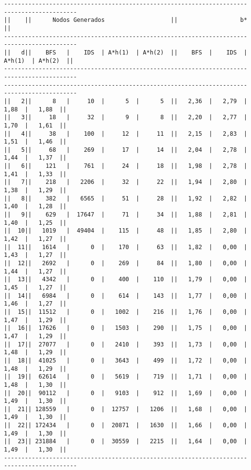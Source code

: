 \documentclass[a4paper]{article}
\begin{document}
\begin{lstlisting}[basicstyle=\footnotesize]
-------------------------------------------------------------------------------------------
||    ||      Nodos Generados                   ||                  b*                   ||
-------------------------------------------------------------------------------------------
||   d||    BFS   |    IDS  | A*h(1)  | A*h(2)  ||    BFS  |    IDS  | A*h(1)  | A*h(2)  ||
-------------------------------------------------------------------------------------------
-------------------------------------------------------------------------------------------
||   2||      8   |     10  |      5  |      5  ||   2,36  |   2,79  |   1,88  |   1,88  ||
||   3||     18   |     32  |      9  |      8  ||   2,20  |   2,77  |   1,70  |   1,61  ||
||   4||     38   |    100  |     12  |     11  ||   2,15  |   2,83  |   1,51  |   1,46  ||
||   5||     68   |    269  |     17  |     14  ||   2,04  |   2,78  |   1,44  |   1,37  ||
||   6||    121   |    761  |     24  |     18  ||   1,98  |   2,78  |   1,41  |   1,33  ||
||   7||    218   |   2206  |     32  |     22  ||   1,94  |   2,80  |   1,38  |   1,29  ||
||   8||    382   |   6565  |     51  |     28  ||   1,92  |   2,82  |   1,40  |   1,28  ||
||   9||    629   |  17647  |     71  |     34  ||   1,88  |   2,81  |   1,40  |   1,25  ||
||  10||   1019   |  49404  |    115  |     48  ||   1,85  |   2,80  |   1,42  |   1,27  ||
||  11||   1614   |      0  |    170  |     63  ||   1,82  |   0,00  |   1,43  |   1,27  ||
||  12||   2692   |      0  |    269  |     84  ||   1,80  |   0,00  |   1,44  |   1,27  ||
||  13||   4342   |      0  |    400  |    110  ||   1,79  |   0,00  |   1,45  |   1,27  ||
||  14||   6984   |      0  |    614  |    143  ||   1,77  |   0,00  |   1,46  |   1,27  ||
||  15||  11512   |      0  |   1002  |    216  ||   1,76  |   0,00  |   1,47  |   1,29  ||
||  16||  17626   |      0  |   1503  |    290  ||   1,75  |   0,00  |   1,47  |   1,29  ||
||  17||  27077   |      0  |   2410  |    393  ||   1,73  |   0,00  |   1,48  |   1,29  ||
||  18||  41025   |      0  |   3643  |    499  ||   1,72  |   0,00  |   1,48  |   1,29  ||
||  19||  62614   |      0  |   5619  |    719  ||   1,71  |   0,00  |   1,48  |   1,30  ||
||  20||  90112   |      0  |   9103  |    912  ||   1,69  |   0,00  |   1,49  |   1,30  ||
||  21|| 128559   |      0  |  12757  |   1206  ||   1,68  |   0,00  |   1,49  |   1,30  ||
||  22|| 172434   |      0  |  20871  |   1630  ||   1,66  |   0,00  |   1,49  |   1,30  ||
||  23|| 231884   |      0  |  30559  |   2215  ||   1,64  |   0,00  |   1,49  |   1,30  ||
-------------------------------------------------------------------------------------------
\end{lstlisting}
\end{document}
